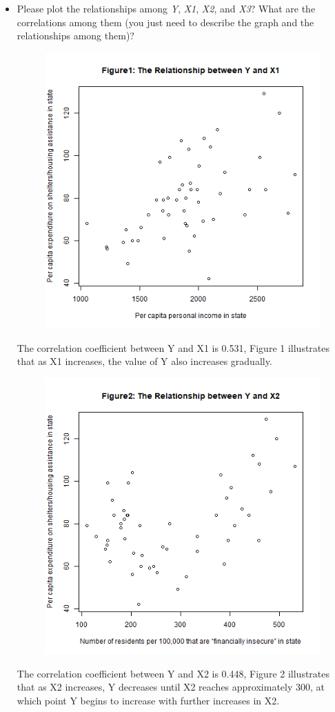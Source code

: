 \documentclass[12pt,letterpaper]{article}
\begin{document}
\begin{itemize}

  
\item
Please plot the relationships among \emph{Y}, \emph{X1}, \emph{X2}, and \emph{X3}? What are the correlations among them (you just need to describe the graph and the relationships among them)?
  
\begin{figure}[H]
	\centering
	\includegraphics[width=.55\textwidth]{Y~X1.png}
\end{figure}
\noindent The correlation coefficient between Y and X1 is 0.531, Figure 1 illustrates that as X1 increases, the value of Y also increases gradually. \\

\begin{figure}[H]
	\centering
	\includegraphics[width=.55\textwidth]{Y~X2.png}
\end{figure}
\noindent The correlation coefficient between Y and X2 is 0.448, Figure 2 illustrates that as X2 increases, Y decreases until X2 reaches approximately 300, at which point Y begins to increase with further increases in X2. \\


\end{itemize}
\end{document}
